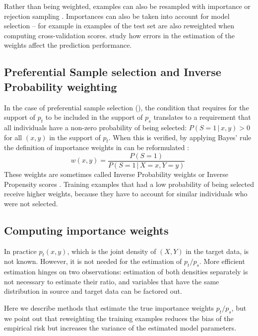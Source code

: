 \documentclass[a4paper,num-refs]{oup-contemporary}
\newcommand{\giv}{ \,|\, }
\begin{document}
Rather than being weighted, examples can also be resampled with importance or rejection
sampling \citep{zadrozny2003cost,zadrozny2004learning}. Importances can also be
taken into account for model selection -- for example in
\citet{sugiyama2007covariate} examples of the test set are also reweighted when
computing cross-validation scores.
%
 study how errors in the estimation of the weights
affect the prediction performance.

\subsection{Preferential Sample selection and Inverse Probability weighting}

In the case of preferential sample selection
(), the condition that requires for the
support of \(p_t\) to be included in the support of \(p_s\) translates to a
requirement that all individuals have a non-zero probability of being selected:
\(P(S=1 \giv x,y) > 0\) for all \((x, y)\) in the support of \(p_t\).
%
When this is verified, by applying Bayes' rule the definition of importance
weights in  can be reformulated
\citep[see][Sec. 2.3]{cortes2008sample}:
\begin{equation}\label{eq:inverse-probability-weight-definition}
  w(x, y) = \frac{P(S=1)}{P(S=1 \giv X=x,Y=y)} \;
\end{equation}
%
These weights are sometimes called Inverse Probability weights
\citep{hernan2004structural} or Inverse Propensity scores
\citep{austin2011introduction}. Training examples that had a low probability of
being selected receive higher weights, because they have to account for similar
individuals who were not selected.
%

\subsection{Computing importance weights}

In practice \(p_t(x, y)\), which is the joint density of \((X,
Y)\) in the target data, is not known. However, it is not needed for the estimation of \(p_t / p_s\).
%
More efficient estimation hinges on two observations: estimation
of both densities separately is not necessary to estimate their ratio, and
variables that have the same distribution in source and target data can be factored out.

Here we describe methods that estimate the true importance weights \(p_t /
p_s\), but we point out that reweighting the training examples reduces the bias
of the empirical risk but increases the variance of the estimated model
parameters.
%
\end{document}
